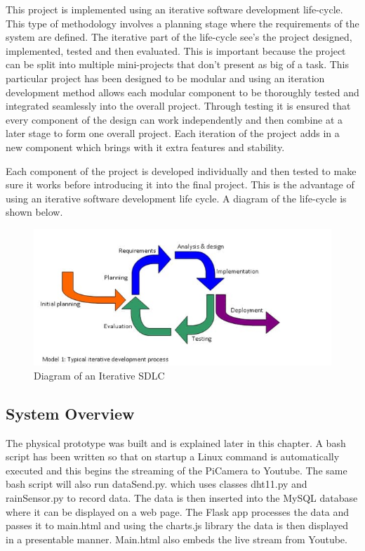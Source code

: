 \documentclass[10pt,a4paper]{article}
\begin{document}
This project is implemented using an iterative software development life-cycle. This type of methodology involves a planning stage where the requirements of the system are defined. The iterative part of the life-cycle see's the project designed, implemented, tested and then evaluated. This is important because the project can be split into multiple mini-projects that don't present as big of a task. This particular project has been designed to be modular and using an iteration development method allows each modular component to be thoroughly tested and integrated seamlessly into the overall project. Through testing it is ensured that every component of the design can work independently and then combine at a later stage to form one overall project. Each iteration of the project adds in a new component which brings with it extra features and stability. 

Each component of the project is developed individually and then tested to make sure it works before introducing it into the final project. This is the advantage of using an iterative software development life cycle. A diagram of the life-cycle is shown below. 

\begin{figure}[H]
  \centering
    \includegraphics[width=\linewidth]{images/iterativemodel.jpg}
    \caption{Diagram of an Iterative SDLC\cite{website:testingexcellence}}
    \label{fig:iterativemodel}
\end{figure}

\subsection{System Overview}
The physical prototype was built and is explained later in this chapter. A bash script has been written so that on startup a Linux command is automatically executed and this begins the streaming of the PiCamera to Youtube. The same bash script will also run dataSend.py. which uses classes dht11.py and rainSensor.py to record data. The data is then inserted into the MySQL database where it can be displayed on a web page. The Flask app processes the data and passes it to main.html and using the charts.js library the data is then displayed in a presentable manner. Main.html also embeds the live stream from Youtube. 
\end{document}
